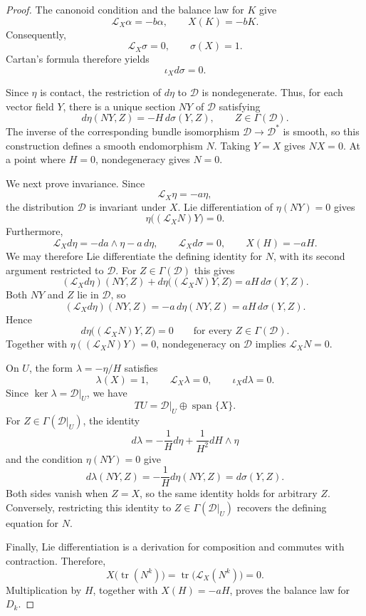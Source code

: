 \documentclass[10pt,a4paper]{amsart}
\numberwithin{equation}{section}
\begin{document}
\begin{proof}
The canonoid condition and the balance law for $K$ give
\[
\mathcal L_X\alpha=-b\alpha,
\qquad
X(K)=-bK.
\]
Consequently,
\[
\mathcal L_X\sigma=0,
\qquad
\sigma(X)=1.
\]
Cartan's formula therefore yields
\[
\iota_Xd\sigma=0.
\]

Since $\eta$ is contact, the restriction of $d\eta$ to
$\mathcal D$ is nondegenerate. Thus, for each vector field $Y$,
there is a unique section $NY$ of $\mathcal D$ satisfying
\[
d\eta(NY,Z)=-H\,d\sigma(Y,Z),
\qquad Z\in\Gamma(\mathcal D).
\]
The inverse of the corresponding bundle isomorphism
$\mathcal D\to\mathcal D^*$ is smooth, so this construction
defines a smooth endomorphism $N$. Taking $Y=X$ gives $NX=0$.
At a point where $H=0$, nondegeneracy gives $N=0$.

We next prove invariance. Since
\[
\mathcal L_X\eta=-a\eta,
\]
the distribution $\mathcal D$ is invariant under $X$.
Lie differentiation of $\eta(NY)=0$ gives
\[
\eta\bigl((\mathcal L_XN)Y\bigr)=0.
\]
Furthermore,
\[
\mathcal L_Xd\eta=-da\wedge\eta-a\,d\eta,
\qquad
\mathcal L_Xd\sigma=0,
\qquad
X(H)=-aH.
\]
We may therefore Lie differentiate the defining identity for
$N$, with its second argument restricted to $\mathcal D$.
For $Z\in\Gamma(\mathcal D)$ this gives
\[
(\mathcal L_Xd\eta)(NY,Z)
+d\eta\bigl((\mathcal L_XN)Y,Z\bigr)
=aH\,d\sigma(Y,Z).
\]
Both $NY$ and $Z$ lie in $\mathcal D$, so
\[
(\mathcal L_Xd\eta)(NY,Z)
=-a\,d\eta(NY,Z)
=aH\,d\sigma(Y,Z).
\]
Hence
\[
d\eta\bigl((\mathcal L_XN)Y,Z\bigr)=0
\qquad\text{for every }Z\in\Gamma(\mathcal D).
\]
Together with
$\eta((\mathcal L_XN)Y)=0$, nondegeneracy on $\mathcal D$
implies $\mathcal L_XN=0$.

On $U$, the form $\lambda=-\eta/H$ satisfies
\[
\lambda(X)=1,\qquad
\mathcal L_X\lambda=0,\qquad
\iota_Xd\lambda=0.
\]
Since $\ker\lambda=\mathcal D|_U$, we have
\[
TU=\mathcal D|_U\oplus\operatorname{span}\{X\}.
\]
For $Z\in\Gamma(\mathcal D|_U)$, the identity
\[
d\lambda=-\frac{1}{H}d\eta
+\frac{1}{H^2}dH\wedge\eta
\]
and the condition $\eta(NY)=0$ give
\[
d\lambda(NY,Z)
=-\frac{1}{H}d\eta(NY,Z)
=d\sigma(Y,Z).
\]
Both sides vanish when $Z=X$, so the same identity holds
for arbitrary $Z$. Conversely, restricting this identity
to $Z\in\Gamma(\mathcal D|_U)$ recovers the defining
equation for $N$.

Finally, Lie differentiation is a derivation for composition
and commutes with contraction. Therefore,
\[
X\bigl(\operatorname{tr}(N^k)\bigr)
=\operatorname{tr}\bigl(\mathcal L_X(N^k)\bigr)=0.
\]
Multiplication by $H$, together with $X(H)=-aH$, proves
the balance law for $D_k$.
\end{proof}
\end{document}
